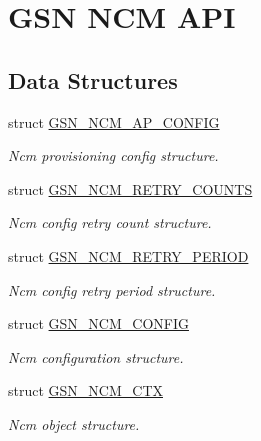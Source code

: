 \hypertarget{a00688}{
\section{GSN NCM API}
\label{a00688}
}
\subsection*{Data Structures}
\begin{DoxyCompactItemize}
\item 
struct \hyperlink{a00156}{GSN\_\-NCM\_\-AP\_\-CONFIG}
\begin{DoxyCompactList}\small\item\em Ncm provisioning config structure. \end{DoxyCompactList}\item 
struct \hyperlink{a00161}{GSN\_\-NCM\_\-RETRY\_\-COUNTS}
\begin{DoxyCompactList}\small\item\em Ncm config retry count structure. \end{DoxyCompactList}\item 
struct \hyperlink{a00162}{GSN\_\-NCM\_\-RETRY\_\-PERIOD}
\begin{DoxyCompactList}\small\item\em Ncm config retry period structure. \end{DoxyCompactList}\item 
struct \hyperlink{a00157}{GSN\_\-NCM\_\-CONFIG}
\begin{DoxyCompactList}\small\item\em Ncm configuration structure. \end{DoxyCompactList}\item 
struct \hyperlink{a00158}{GSN\_\-NCM\_\-CTX}
\begin{DoxyCompactList}\small\item\em Ncm object structure. \end{DoxyCompactList}\end{DoxyCompactItemize}
